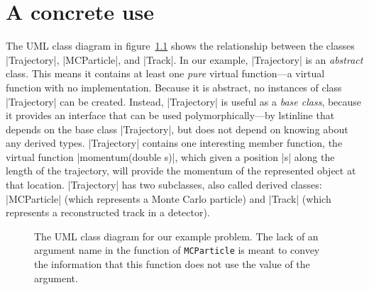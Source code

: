 \documentclass[screen]{memarticle}
\begin{document}
\chapter{A concrete use\label{ch:concrete-use}}
The UML class diagram in figure~\ref{fig:prongdiagram} shows the
relationship between the classes |Trajectory|, |MCParticle|, and
|Track|. In our example, |Trajectory| is an \emph{abstract}
class. This means it contains at least one \emph{pure} virtual
function---a virtual function with no implementation. Because it is
abstract, no instances of class |Trajectory| can be created. Instead,
|Trajectory| is useful as a \emph{base class}, because it provides an
interface that can be used polymorphically---by lstinline that depends on
the base class |Trajectory|, but does not depend on knowing about any
derived types. |Trajectory| contains one interesting member function,
the virtual function |momentum(double s)|, which given a position |s|
along the length of the trajectory, will provide the momentum of the
represented object at that location. |Trajectory| has two subclasses,
also called derived classes: |MCParticle| (which represents a Monte
Carlo particle) and |Track| (which represents a reconstructed track in
a detector).
\begin{figure}[!ht]
  \centering
  \caption{The UML class diagram for our example problem. The lack of
    an argument name in the function of \lstinline{MCParticle} is meant to
    convey the information that this function does not use the value of the argument.}
  \label{fig:prongdiagram}
\end{figure}

\appendix

\end{document}
